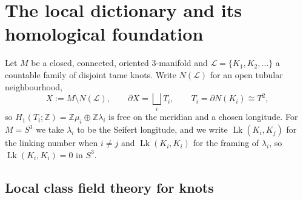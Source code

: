 \documentclass[11pt]{amsart}
\numberwithin{equation}{section}
\theoremstyle{definition}
\theoremstyle{remark}
\newcommand{\Z}{\mathbb{Z}}
\newcommand{\cL}{\mathcal{L}}
\newcommand{\pp}{\mathfrak{p}}
\newcommand{\qq}{\mathfrak{q}}
\newcommand{\Lk}{\operatorname{Lk}}
\begin{document}
\begin{abstract}
Section~\ref{sec:autopsy} isolates why the meridian is the wrong choice: $\mu_i$ is a single
basis vector of $H_1(S^3\setminus\cL)$, so $D_\chi$ is finite and $\Xi_\beta$ is everything at
every temperature. This is what inertia should do --- inertia is what an unramified cover
kills, and the phase structure lives in the unramified direction. The contrast with
$\sigma_\pp=(\pi_\pp)_{\qq\ne\pp}$, nontrivial at every other place by the product
formula, is exact: reciprocity and linking are two ways of spreading a local generator over
infinitely many places.
\end{abstract}

\maketitle

\tableofcontents

\section{The local dictionary and its homological foundation}\label{sec:local}

Let $M$ be a closed, connected, oriented $3$-manifold and $\cL=\{K_1,K_2,\dots\}$ a countable
family of disjoint tame knots. Write $N(\cL)$ for an open tubular neighbourhood,
\[
X:=M\setminus N(\cL),\qquad \partial X=\bigsqcup_iT_i,\qquad T_i=\partial N(K_i)\cong T^2,
\]
so $H_1(T_i;\Z)=\Z\mu_i\oplus\Z\lambda_i$ is free on the meridian and a chosen longitude.
For $M=S^3$ we take $\lambda_i$ to be the Seifert longitude, and we write $\Lk(K_i,K_j)$ for
the linking number when $i\ne j$ and $\Lk(K_i,K_i)$ for the framing of $\lambda_i$, so
$\Lk(K_i,K_i)=0$ in $S^3$.

\subsection{Local class field theory for knots}
\end{document}
